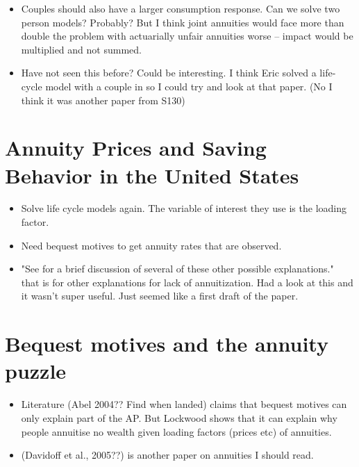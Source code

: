 \documentclass[12pt]{article}
\begin{document}
\begin{itemize}
  \item Couples should also have a larger consumption response. Can we solve
        two person models? Probably? But I think joint annuities would face
        more than double the problem with actuarially unfair annuities worse --
        impact would be multiplied and not summed.

  \item Have not seen this before? Could be interesting. I think Eric solved a life-cycle model
        with a couple in so I could try and look at that paper. (No I think it was another paper from S130)

\end{itemize}

\section{Annuity Prices and Saving Behavior in the United States}
\begin{itemize}
  \item Solve life cycle models again. The variable of interest they use is the
        loading factor.

  \item Need bequest motives to get annuity rates that are observed.
  \item "See \cite{friedman_warshawsky_nber_1985} for a brief discussion of several
        of these other possible explanations." that is for other explanations for
        lack of annuitization. Had a look at this and it wasn't super useful. Just
        seemed like a first draft of the paper.



\end{itemize}


\section{Bequest motives and the annuity puzzle}
\begin{itemize}
  \item Literature (Abel 2004?? Find when landed) claims that bequest motives
        can only explain part of the AP. But Lockwood shows that it can explain why people
        annuitise no wealth given loading factors (prices etc) of annuities.

  \item  (Davidoff et al., 2005??) is another paper on annuities I should read.


\end{itemize}
\end{document}
